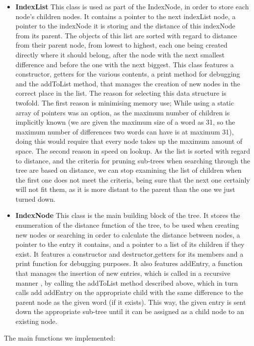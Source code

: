 \documentclass{article}
\begin{document}
\begin{itemize}
  \item \textbf{IndexList}
  This class is used as part of the IndexNode, in order to store each node's children nodes. It contains a pointer to the next indexList node, a pointer to the indexNode it is storing and the distance of this indexNode from its parent. The objects of this list are sorted with regard to distance from their parent node, from lowest to highest, each one being created directly where it should belong, after the node with the next smallest difference and before the one with the next biggest. This class features a constructor, getters for the various contents, a print method for debugging and the addToList method, that manages the creation of new nodes in the correct place in the list. The reason for selecting this data structure is twofold. The first reason is minimising memory use; While using a static array of pointers was an option, as the maximum number of children is implicitly known (we are given the maximum size of a word as 31, so the maximum number of differences two words can have is at maximum 31), doing this would require that every node takes up the maximum amount of space. The second reason in speed on lookup. As the list is sorted with regard to distance, and the criteria for pruning sub-trees when searching through the tree are based on distance, we can stop examining the list of children when the first one does not meet the criteria, being sure that the next one certainly will not fit them, as it is more distant to the parent than the one we just turned down. 
  \item \textbf{IndexNode}
  This class is the main building block of the tree. It stores the enumeration of the distance function of the tree, to be used when creating new nodes or searching in order to calculate the distance between nodes, a pointer to the entry it contains, and a pointer to a list of its children if they exist. It features a constructor and destructor,getters for its members and a print function for debugging purposes. It also features addEntry, a function that manages the insertion of new entries, which is called in a recursive manner , by calling the addToList method described above, which in turn calls add addEntry on the appropriate child with the same difference to the parent node as the given word (if it exists). This way, the given entry is sent down the appropriate sub-tree until it can be assigned as a child node to an existing node. 
\end{itemize}
The main functions we implemented:
\end{document}

